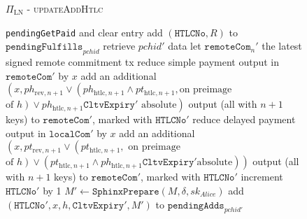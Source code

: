 \begin{figure}[H]
\begin{protocolbox}{$\Pi_{\mathrm{LN}}$ - \textsc{updateAddHtlc}}
\begin{algorithmic}[1]
            \texttt{pendingGetPaid} and clear entry
            \State add $\left(\mathtt{HTLCNo}, R\right)$ to
            $\mathtt{pendingFulfills}_{\mathit{pchid}}$
           
            \State retrieve $\mathit{pchid}'$ data
            \State let $\mathtt{remoteCom}_n'$ the latest signed remote
            commitment tx
            \State reduce simple payment output in $\mathtt{remoteCom}'$ by $x$
            \State add an additional $\left(x, ph_{\mathrm{rev}, n+1} \vee
            \left(ph_{\mathrm{htlc}, n+1} \wedge pt_{\mathrm{htlc}, n+1}, \text{
            on preimage}\right.\right.$ $\left.\left.\text{of } h\right) \vee
            ph_{\mathrm{htlc}, n+1}\mathtt{CltvExpiry}' \text{ absolute}\right)$
            output (all with $n+1$ keys) to $\mathtt{remoteCom}'$, marked with
            $\texttt{HTLCNo}'$
            \State reduce delayed payment output in $\mathtt{localCom}'$ by $x$
            \State add an additional $\left(x, pt_{\mathrm{rev}, n+1} \vee
            \left(pt_{\mathrm{htlc}, n+1}, \text{ on preimage}\right.\right.$
            $\left.\left.\text{of } h\right) \vee \left(pt_{\mathrm{htlc}, n+1}
            \wedge ph_{\mathrm{htlc}, n+1}\mathtt{CltvExpiry}' \text{
            absolute}\right)\right)$ output (all with $n+1$ keys) to
            $\mathtt{remoteCom}'$, marked with $\texttt{HTLCNo}'$
            \State increment $\texttt{HTLCNo}'$ by 1
            \State $M' \gets \mathtt{SphinxPrepare}\left(M, \delta,
            sk_{\mathit{Alice}}\right)$
            \State add $\left(\mathtt{HTLCNo}', x, h, \mathtt{CltvExpiry}',
            M'\right)$ to $\mathtt{pendingAdds}_{\mathit{pchid}'}$
          \EndIf
        \EndIndent
      \end{algorithmic}
    \end{protocolbox}
    \caption{}
    \label{alg:protocol:pay:updateAddHtlc}
  \end{figure}

